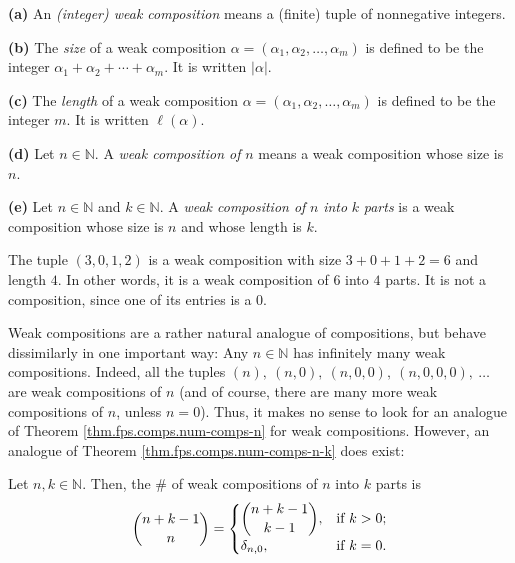 \begin{definition}
\label{def.fps.wcomps}\textbf{(a)} An \emph{(integer) weak composition} means
a (finite) tuple of nonnegative integers. \medskip

\textbf{(b)} The \emph{size} of a weak composition $\alpha=\left(  \alpha
_{1},\alpha_{2},\ldots,\alpha_{m}\right)  $ is defined to be the integer
$\alpha_{1}+\alpha_{2}+\cdots+\alpha_{m}$. It is written $\left\vert
\alpha\right\vert $. \medskip

\textbf{(c)} The \emph{length} of a weak composition $\alpha=\left(
\alpha_{1},\alpha_{2},\ldots,\alpha_{m}\right)  $ is defined to be the integer
$m$. It is written $\ell\left(  \alpha\right)  $. \medskip

\textbf{(d)} Let $n\in\mathbb{N}$. A \emph{weak composition of }$n$ means a
weak composition whose size is $n$. \medskip

\textbf{(e)} Let $n\in\mathbb{N}$ and $k\in\mathbb{N}$. A \emph{weak
composition of }$n$\emph{ into }$k$\emph{ parts} is a weak composition whose
size is $n$ and whose length is $k$.
\end{definition}

\begin{example}
\label{exa.fps.wcomps.1}The tuple $\left(  3,0,1,2\right)  $ is a weak
composition with size $3+0+1+2=6$ and length $4$. In other words, it is a weak
composition of $6$ into $4$ parts. It is not a composition, since one of its
entries is a $0$.
\end{example}

Weak compositions are a rather natural analogue of compositions, but behave
dissimilarly in one important way: Any $n\in\mathbb{N}$ has infinitely many
weak compositions. Indeed, all the tuples $\left(  n\right)  ,\ \left(
n,0\right)  ,\ \left(  n,0,0\right)  ,\ \left(  n,0,0,0\right)  ,\ \ldots$ are
weak compositions of $n$ (and of course, there are many more weak compositions
of $n$, unless $n=0$). Thus, it makes no sense to look for an analogue of
Theorem \ref{thm.fps.comps.num-comps-n} for weak compositions. However, an
analogue of Theorem \ref{thm.fps.comps.num-comps-n-k} does exist:

\begin{theorem}
\label{thm.fps.comps.num-wcomps-n-k}Let $n,k\in\mathbb{N}$. Then, the \# of
weak compositions of $n$ into $k$ parts is
\[
\dbinom{n+k-1}{n}=%
\begin{cases}
\dbinom{n+k-1}{k-1}, & \text{if }k>0;\\
\delta_{n,0}, & \text{if }k=0.
\end{cases}
\]

\end{theorem}

